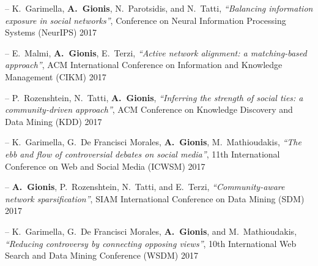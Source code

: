 \documentclass[a4paper,11pt]{article}
\begin{document}
\item[--] 
{K.\ Garimella, \textbf{A.\ Gionis}, N.\ Parotsidis, and N.\ Tatti}, 
{\em ``Balancing information exposure in social networks''}, 
Conference on Neural Information Processing Systems (NeurIPS) 2017

\item[--] 
{E.\ Malmi, \textbf{A.\ Gionis}, E.\ Terzi}, 
{\em ``Active network alignment: a matching-based approach''}, 
ACM International Conference on Information and Knowledge Management (CIKM) 2017


\item[--] 
{P.\ Rozenshtein, N.\ Tatti, \textbf{A.\ Gionis}}, 
{\em ``Inferring the strength of social ties: a community-driven approach''}, 
ACM Conference on Knowledge Discovery and Data Mining (KDD) 2017

\item[--] 
{K.\ Garimella, G.\ De Francisci Morales, \textbf{A.\ Gionis}, M.\ Mathioudakis},
{\em ``The ebb and flow of controversial debates on social media''}, 
11th International Conference on Web and Social Media (ICWSM) 2017



\item[--] 
{\textbf{A.\ Gionis}, P.\ Rozenshtein, N.\ Tatti, and E.\ Terzi},
{\em ``Community-aware network sparsification''}, 
SIAM International Conference on Data Mining (SDM) 2017

\item[--] 
{K.\ Garimella, G.\ De Francisci Morales, \textbf{A.\ Gionis}, and M.\ Mathioudakis},
{\em ``Reducing controversy by connecting opposing views''}, 
10th International Web Search and Data Mining Conference (WSDM) 2017
\end{document}
